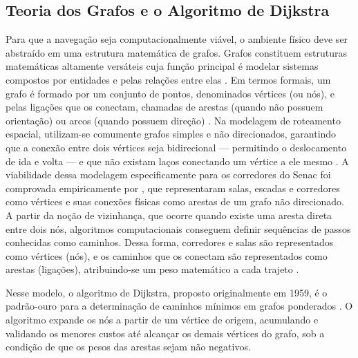 \documentclass[
    12pt,                %
    openright,           %
    oneside,             %
    a4paper,             %
    english,             %
    brazil               %
]{abntex2}
\begin{document}
\subsection{Teoria dos Grafos e o Algoritmo de Dijkstra}

Para que a navegação seja computacionalmente viável, o ambiente físico deve ser
abstraído em uma estrutura matemática de grafos. Grafos constituem estruturas 
matemáticas altamente versáteis cuja função principal é modelar sistemas compostos 
por entidades e pelas relações entre elas \cite{Goldbarg2012}. Em termos formais, 
um grafo é formado por um conjunto de pontos, denominados vértices (ou nós), e 
pelas ligações que os conectam, chamadas de arestas (quando não possuem orientação) 
ou arcos (quando possuem direção) \cite{Goldbarg2012}. Na modelagem de roteamento 
espacial, utilizam-se comumente grafos simples e não direcionados, garantindo que 
a conexão entre dois vértices seja bidirecional --- permitindo o deslocamento de 
ida e volta --- e que não existam laços conectando um vértice a ele mesmo 
\cite{Goldbarg2012}. A viabilidade dessa modelagem especificamente para os 
corredores do Senac foi comprovada empiricamente por , 
que representaram salas, escadas e corredores como vértices e suas conexões físicas 
como arestas de um grafo não direcionado.
A partir da noção de vizinhança, que ocorre quando existe uma aresta direta entre
dois nós, algoritmos computacionais conseguem definir sequências de passos
conhecidas como caminhos. Dessa forma, corredores e salas são representados como
vértices (nós), e os caminhos que os conectam são representados como arestas
(ligações), atribuindo-se um peso matemático a cada trajeto \cite{Stancel2021}.

Nesse modelo, o algoritmo de Dijkstra, proposto originalmente em 1959, é o
padrão-ouro para a determinação de caminhos mínimos em grafos ponderados
\cite{Cormen2009}. O algoritmo expande os nós a partir de um vértice de
origem, acumulando e validando os menores custos até alcançar os demais vértices
do grafo, sob a condição de que os pesos das arestas sejam não negativos.
\end{document}
